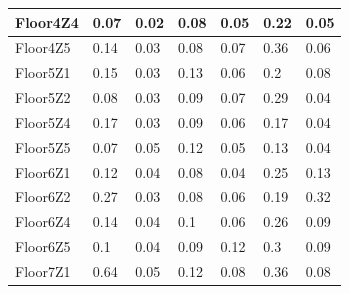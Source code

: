 \begin{table}[]
\begin{tabular}{|l|l|l|l|l|l|l|}
Floor4Z4 & 0.07                     & 0.02                             & 0.08                          & 0.05                         & 0.22                          & 0.05                            \\ \hline
Floor4Z5 & 0.14                     & 0.03                             & 0.08                          & 0.07                         & 0.36                          & 0.06                            \\ \hline
Floor5Z1 & 0.15                     & 0.03                             & 0.13                          & 0.06                         & 0.2                           & 0.08                            \\ \hline
Floor5Z2 & 0.08                     & 0.03                             & 0.09                          & 0.07                         & 0.29                          & 0.04                            \\ \hline
Floor5Z4 & 0.17                     & 0.03                             & 0.09                          & 0.06                         & 0.17                          & 0.04                            \\ \hline
Floor5Z5 & 0.07                     & 0.05                             & 0.12                          & 0.05                         & 0.13                          & 0.04                            \\ \hline
Floor6Z1 & 0.12                     & 0.04                             & 0.08                          & 0.04                         & 0.25                          & 0.13                            \\ \hline
Floor6Z2 & 0.27                     & 0.03                             & 0.08                          & 0.06                         & 0.19                          & 0.32                            \\ \hline
Floor6Z4 & 0.14                     & 0.04                             & 0.1                           & 0.06                         & 0.26                          & 0.09                            \\ \hline
Floor6Z5 & 0.1                      & 0.04                             & 0.09                          & 0.12                         & 0.3                           & 0.09                            \\ \hline
Floor7Z1 & 0.64                     & 0.05                             & 0.12                          & 0.08                         & 0.36                          & 0.08                            \\ \hline

\end{tabular}
\end{table}
